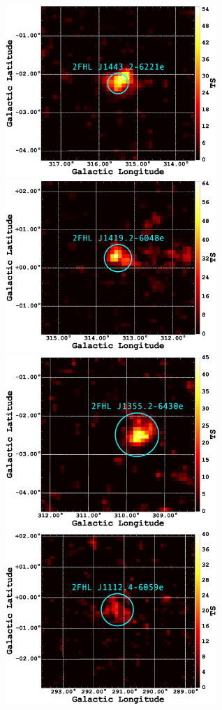 \begin{figure}[!ht]
	\begin{centering}
		\vspace*{-1cm}
		\includegraphics[width=8cm]{Figures/l315_b0_ES_3_residTSmap_2FHL_zoom.eps}
		\includegraphics[width=8cm]{Figures/l315_b0_ES_4_residTSmap_2FHL_zoom.eps}
		\includegraphics[width=8cm]{Figures/l315_b0_ES_1_residTSmap_2FHL_zoom.eps}
		\includegraphics[width=8cm]{Figures/l290_b0_ES_1_residTSmap_2FHL_zoom.eps}

\end{centering}
\end{figure}
